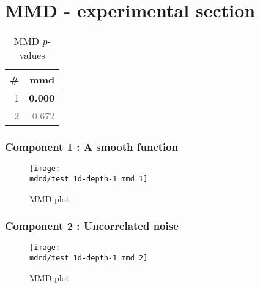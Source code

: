 \documentclass{article} %
\begin{document}
\section{MMD - experimental section}
\label{sec:mmd}

\begin{table}[htb]
\begin{center}
{\small
\begin{tabular}{|r|r|}
\hline
\bf{\#} & {mmd}\\
\hline

1 & \textbf{0.000}\\

2 & \textcolor{gray}{0.672}\\

\hline
\end{tabular}
\caption{
MMD $p$-values
}
\label{table:mmd}
}
\end{center}
\end{table}

\subsubsection{Component 1 : A smooth function}

\begin{figure}[H]
\newcommand{\wmgd}{0.5\columnwidth}
\newcommand{\hmgd}{3.0cm}
\newcommand{\mdrd}{test_1d-depth-1}
\newcommand{\mbm}{\hspace{-0.3cm}}
\texttt{[image: \\mdrd/test\_1d-depth-1\_mmd\_1]}
\caption{
MMD plot}
\label{fig:mmd1}
\end{figure}

\subsubsection{Component 2 : Uncorrelated noise}

\begin{figure}[H]
\newcommand{\wmgd}{0.5\columnwidth}
\newcommand{\hmgd}{3.0cm}
\newcommand{\mdrd}{test_1d-depth-1}
\newcommand{\mbm}{\hspace{-0.3cm}}
\texttt{[image: \\mdrd/test\_1d-depth-1\_mmd\_2]}
\caption{
MMD plot}
\label{fig:mmd2}
\end{figure}
\end{document}
